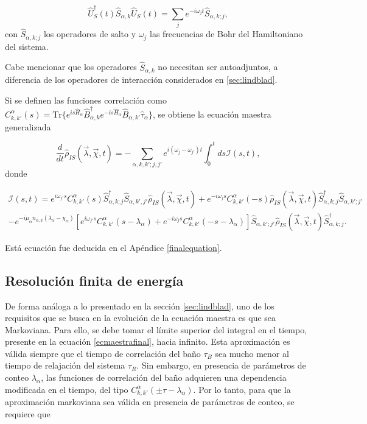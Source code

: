 \begin{equation*}
    \hat{U}^{\dagger}_{S}(t)\hat{S}_{\alpha,k}\hat{U}_{S}(t) = \sum_{j}e^{-i\omega_{j}t}\hat{S}_{\alpha,k;j},
\end{equation*}
con $\hat{S}_{\alpha,k;j}$ los operadores de salto y $\omega_{j}$ las frecuencias de Bohr del Hamiltoniano del sistema. 

Cabe mencionar que los operadores $\hat{S}_{\alpha,k}$ no necesitan ser autoadjuntos, a diferencia de los  operadores de interacción considerados en \ref{sec:lindblad}.

Si se definen las funciones correlación como $C^{\alpha}_{k,k'}(s) = \text{Tr}\{e^{is\hat{H}_{\alpha} }\hat{B}^{\dagger}_{\alpha,k}e^{-is\hat{H}_{\alpha} }\hat{B}_{\alpha,k'}\hat{\tau}_{\alpha}\}$, se obtiene la ecuación maestra generalizada

\begin{equation}
    \frac{d}{dt}\hat{\rho}_{IS}(\vec{\lambda},\vec{\chi},t) = - \sum_{\alpha,k,k';j,j'}e^{i(\omega_{j}-\omega_{j'})t}\int_{0}^{t}ds \mathcal{I}(s,t) ,
\label{ecmaestrafinal}
\end{equation}
donde

\begin{multline}
    \mathcal{I}(s,t) = e^{i\omega_{j'}s} C^{\alpha}_{k,k'}(s)\hat{S}^{\dagger}_{\alpha,k;j}\hat{S}_{\alpha,k',j'}\hat{\rho}_{IS}(\vec{\lambda},\vec{\chi},t) + e^{-i\omega_{j}s}C^{\alpha}_{k,k'}(-s)\hat{\rho}_{IS}(\vec{\lambda},\vec{\chi},t)\hat{S}^{\dagger}_{\alpha,k;j}\hat{S}_{\alpha,k';j'} \\
    - e^{-i\mu_{\alpha}n_{\alpha,k}(\lambda_{\alpha} - \chi_{\alpha})}\left[e^{i\omega_{j'}s}C^{\alpha}_{k,k'}(s-\lambda_{\alpha}) + e^{-i\omega_{j}s}C^{\alpha}_{k,k'}(-s-\lambda_{\alpha})  \right]  \hat{S}_{\alpha,k';j'}\hat{\rho}_{IS}(\vec{\lambda},\vec{\chi},t)\hat{S}^{\dagger}_{\alpha,k;j}.
    \label{ecmaestrafinalI}
\end{multline}

Está ecuación fue deducida en el Apéndice \ref{finalequation}.

\label{sec2:master}

\subsection{Resolución finita de energía}
De forma análoga a lo presentado en la sección \ref{sec:lindblad}, uno de los requisitos que se busca en la evolución de la ecuación maestra es que sea Markoviana. Para ello, se debe tomar el límite superior del integral en el tiempo, presente en la ecuación \ref{ecmaestrafinal}, hacia infinito. Esta aproximación es válida siempre que el tiempo de correlación del baño $\tau_{B}$ sea mucho menor al tiempo de relajación del sistema $\tau_{R}$. Sin embargo, en presencia de parámetros de conteo $\lambda_{\alpha}$, las funciones de correlación del baño adquieren una dependencia modificada en el tiempo, del tipo $C^{\alpha}_{k,k'}(\pm \tau - \lambda_\alpha)$. Por lo tanto, para que la aproximación markoviana sea válida en presencia de parámetros de conteo, se requiere que 

